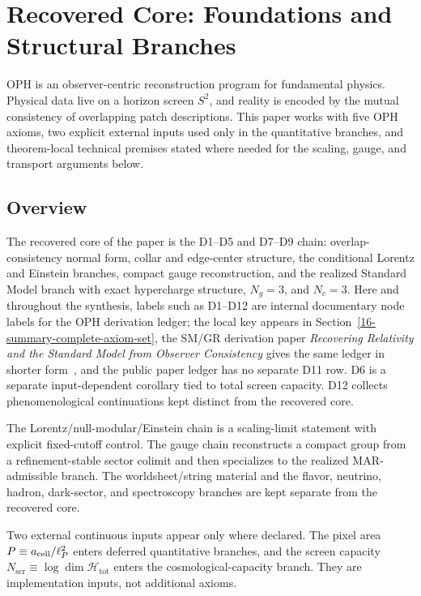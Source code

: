 \section{Recovered Core: Foundations and Structural Branches}\label{observer-patch-holography}

OPH is an observer-centric reconstruction program for fundamental physics. Physical data live on a horizon screen \(S^2\), and reality is encoded by the mutual consistency of overlapping patch descriptions. This paper works with five OPH axioms, two explicit external inputs used only in the quantitative branches, and theorem-local technical premises stated where needed for the scaling, gauge, and transport arguments below.

\subsection{Overview}\label{overview}

The recovered core of the paper is the D1--D5 and D7--D9 chain: overlap-consistency normal form, collar and edge-center structure, the conditional Lorentz and Einstein branches, compact gauge reconstruction, and the realized Standard Model branch with exact hypercharge structure, \(N_g=3\), and \(N_c=3\). Here and throughout the synthesis, labels such as D1--D12 are internal documentary node labels for the OPH derivation ledger; the local key appears in Section~\ref{16-summary-complete-axiom-set}, the SM/GR derivation paper \emph{Recovering Relativity and the Standard Model from Observer Consistency} gives the same ledger in shorter form~\cite{ophcompact}, and the public paper ledger has no separate D11 row. D6 is a separate input-dependent corollary tied to total screen capacity. D12 collects phenomenological continuations kept distinct from the recovered core.

The Lorentz/null-modular/Einstein chain is a scaling-limit statement with explicit fixed-cutoff control. The gauge chain reconstructs a compact group from a refinement-stable sector colimit and then specializes to the realized MAR-admissible branch. The worldsheet/string material and the flavor, neutrino, hadron, dark-sector, and spectroscopy branches are kept separate from the recovered core.

Two external continuous inputs appear only where declared. The pixel area \(P \equiv a_{\rm cell}/\ell_P^2\) enters deferred quantitative branches, and the screen capacity \(N_{\mathrm{scr}} \equiv \log \dim \mathcal H_{\mathrm{tot}}\) enters the cosmological-capacity branch. They are implementation inputs, not additional axioms.

